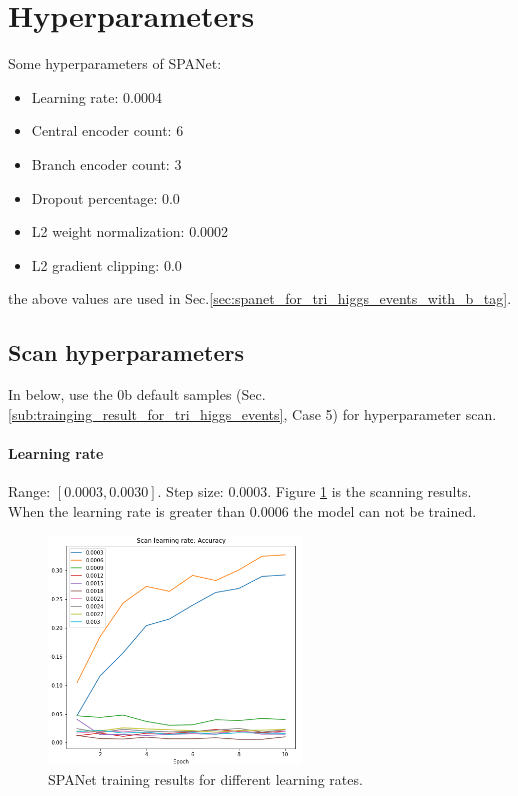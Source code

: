 \documentclass[12pt]{article}
\begin{document}
\section{Hyperparameters}%
\label{sec:hyperparameters}
	Some hyperparameters of SPANet:
	\begin{itemize}
		\item Learning rate: 0.0004
		\item Central encoder count: 6
		\item Branch encoder count: 3
		\item Dropout percentage: 0.0
		\item L2 weight normalization: 0.0002
		\item L2 gradient clipping: 0.0
	\end{itemize}
	the above values are used in Sec.\ref{sec:spanet_for_tri_higgs_events_with_b_tag}.
	\subsection{Scan hyperparameters}%
	\label{sub:scan_hyperparameters}
		In below, use the 0b default samples (Sec.\ref{sub:trainging_result_for_tri_higgs_events}, Case 5) for hyperparameter scan.

		\paragraph{Learning rate} Range: $[0.0003,  0.0030]$. Step size: $0.0003$. Figure \ref{fig:SPANet_scan_lr} is the scanning results. When the learning rate is greater than 0.0006 the model can not be trained.
		\begin{figure}[htpb]
			\centering
			\includegraphics[width=0.6\textwidth]{accuracy_curve_hp_scan_lr.png}
			\caption{SPANet training results for different learning rates.}
			\label{fig:SPANet_scan_lr}
		\end{figure}
\end{document}
